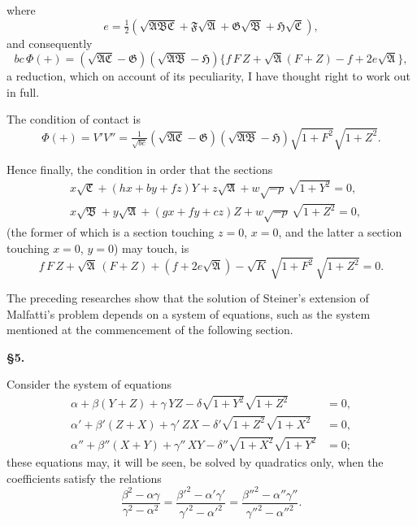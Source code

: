 \documentclass[11pt,a4paper]{book}
\begin{document}
\newpage
\setcounter{page}{67}

where
\[
e = \tfrac{1}{2}(\sqrt{\mathfrak{A}\mathfrak{B}\mathfrak{C}} + \mathfrak{F}\sqrt{\mathfrak{A}} + \mathfrak{G}\sqrt{\mathfrak{B}} + \mathfrak{H}\sqrt{\mathfrak{C}}),
\]
and consequently
\[
bc\,\Phi(+) = (\sqrt{\mathfrak{A}\mathfrak{C}}-\mathfrak{G})(\sqrt{\mathfrak{A}\mathfrak{B}}-\mathfrak{H})\{f\,F\,Z + \sqrt{\mathfrak{A}}(F+Z) - f + 2e\sqrt{\mathfrak{A}}\},
\]
a reduction, which on account of its peculiarity, I have thought right to work out in full.

The condition of contact is
\[
\Phi(+) = V'V'' = \tfrac{1}{\sqrt{bc}}(\sqrt{\mathfrak{A}\mathfrak{C}}-\mathfrak{G})(\sqrt{\mathfrak{A}\mathfrak{B}}-\mathfrak{H})\sqrt{1+F^2}\sqrt{1+Z^2}.
\]

Hence finally, the condition in order that the sections
\begin{align*}
&x\sqrt{\mathfrak{C}} + (hx+by+fz)Y + z\sqrt{\mathfrak{A}} + w\sqrt{-p}\,\sqrt{1+Y^2} = 0,\\
&x\sqrt{\mathfrak{B}} + y\sqrt{\mathfrak{A}} + (gx+fy+cz)Z + w\sqrt{-p}\,\sqrt{1+Z^2} = 0,
\end{align*}
(the former of which is a section touching $z=0$, $x=0$, and the latter a section touching $x=0$, $y=0$) may touch, is
\[
f\,F\,Z + \sqrt{\mathfrak{A}}\,(F+Z) + (f+2e\sqrt{\mathfrak{A}}) - \sqrt{K}\,\sqrt{1+F^2}\,\sqrt{1+Z^2} = 0.
\]

The preceding researches show that the solution of Steiner's extension of Malfatti's problem depends on a system of equations, such as the system mentioned at the commencement of the following section.

\vspace{0.5em}
\noindent\textbf{\S 5.}

Consider the system of equations
\begin{align*}
\alpha + \beta(Y+Z) + \gamma\,YZ - \delta\sqrt{1+Y^2}\sqrt{1+Z^2} &= 0,\\
\alpha' + \beta'(Z+X) + \gamma'\,ZX - \delta'\sqrt{1+Z^2}\sqrt{1+X^2} &= 0,\\
\alpha'' + \beta''(X+Y) + \gamma''\,XY - \delta''\sqrt{1+X^2}\sqrt{1+Y^2} &= 0;
\end{align*}
these equations may, it will be seen, be solved by quadratics only, when the coefficients satisfy the relations
\[
\frac{\beta^2-\alpha\gamma}{\gamma^2-\alpha^2} = \frac{\beta'^2-\alpha'\gamma'}{\gamma'^2-\alpha'^2} = \frac{\beta''^2-\alpha''\gamma''}{\gamma''^2-\alpha''^2}.
\]
\end{document}
